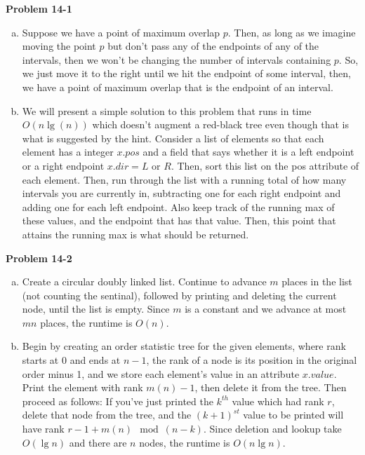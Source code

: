 \documentclass{article}
\begin{document}
\noindent\textbf{ Problem 14-1} \\

\begin{enumerate}[a.]
\item 
Suppose we have a point of maximum overlap $p$. Then, as long as we imagine moving the point $p$ but don't pass any of the endpoints of any of the intervals, then we won't be changing the number of intervals containing $p$. So, we just move it to the right until we hit the endpoint of some interval, then, we have a point of maximum overlap that is the endpoint of an interval.

\item
We will present a simple solution to this problem that runs in time $O(n\lg(n))$ which doesn't augment a red-black tree even though that is what is suggested by the hint. Consider a list of elements so that each element has a integer $x.pos$ and a field that says whether it is a left endpoint or a right endpoint $x.dir = L$ or $R$. Then, sort this list on the pos attribute of each element. Then, run through the list with a running total of how many intervals you are currently in, subtracting one for each right endpoint and adding one for each left endpoint. Also keep track of the running max of these values, and the endpoint that has that value. Then, this point that attains the running max is what should be returned.

\end{enumerate}

\noindent\textbf{Problem 14-2}\\
\begin{enumerate}[a.]
\item Create a circular doubly linked list.  Continue to advance $m$ places in the list (not  counting the sentinal), followed by printing and deleting the current node, until the list is empty. Since $m$ is a constant and we advance at most $mn$ places, the runtime is $O(n)$.\\

\item Begin by creating an order statistic tree for the given elements, where rank starts at 0 and ends at $n-1$, the rank of a node is its position in the original order minus 1, and we store each element's value in an attribute $x.value$.  Print the element with rank $m(n) - 1$, then delete it from the tree.  Then proceed as follows:  If you've just printed the $k^{th}$ value which had rank $r$, delete that node from the tree, and the $(k+1)^{st}$ value to be printed will have rank $r - 1 + m(n) \mod (n-k)$.  Since deletion and lookup take $O(\lg n)$ and there are $n$ nodes, the runtime is $O(n\lg n)$.
\end{enumerate}
\end{document}
